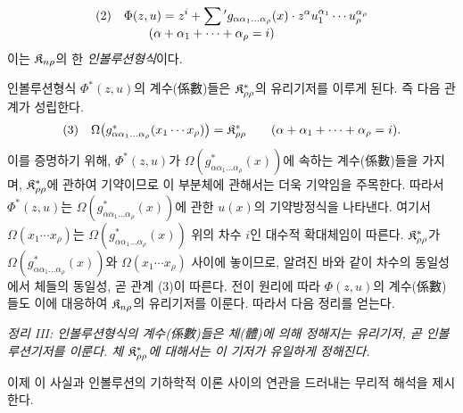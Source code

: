 \[
\begin{array}{@{}l@{\quad}l@{}}
(2)& \displaystyle \Phi(z,u)=z^i+\sum{}'g_{\alpha\alpha_1\ldots\alpha_\rho}(x)\cdot
z^\alpha u_1^{\alpha_1}\cdots u_\rho^{\alpha_\rho}\\
& \displaystyle\qquad(\alpha+\alpha_1+\cdots+\alpha_\rho=i)
\end{array}
\]
이는 $\mathfrak K_{n\rho}$의 한 \emph{인볼루션형식}이다.

인볼루션형식 $\Phi^*(z,u)$의 계수(係數)들은 $\mathfrak K^*_{\rho\rho}$의 유리기저를 이루게 된다. 즉 다음 관계가 성립한다.
\[
\begin{array}{@{}l@{\quad}c@{}}
(3)& \Omega\bigl(g^*_{\alpha\alpha_1\ldots\alpha_\rho}(x_1\cdots x_\rho)\bigr)=\Kfield^*_{\rho\rho}\qquad(\alpha+\alpha_1+\cdots+\alpha_\rho=i).
\end{array}
\]
이를 증명하기 위해, $\Phi^*(z,u)$가 $\Omega(g^*_{\alpha\alpha_1\ldots\alpha_\rho}(x))$에 속하는 계수(係數)들을 가지며, $\mathfrak K^*_{\rho\rho}$에 관하여 기약이므로 이 부분체에 관해서는 더욱 기약임을 주목한다. 따라서 $\Phi^*(z,u)$는 $\Omega(g^*_{\alpha\alpha_1\ldots\alpha_\rho}(x))$에 관한 $u(x)$의 기약방정식을 나타낸다. 여기서 $\Omega(x_1\cdots x_\rho)$는 $\Omega(g^*_{\alpha\alpha_1\ldots\alpha_\rho}(x))$ 위의 차수 $i$인 대수적 확대체임이 따른다. $\mathfrak K^*_{\rho\rho}$가 $\Omega(g^*_{\alpha\alpha_1\ldots\alpha_\rho}(x))$와 $\Omega(x_1\cdots x_\rho)$ 사이에 놓이므로, 알려진 바와 같이 차수의 동일성에서 체들의 동일성, 곧 관계 (3)이 따른다. 전이 원리에 따라 $\Phi(z,u)$의 계수(係數)들도 이에 대응하여 $\mathfrak K_{n\rho}$의 유리기저를 이룬다. 따라서 다음 정리를 얻는다.

\emph{정리 III: 인볼루션형식의 계수(係數)들은 체(體)에 의해 정해지는 유리기저, 곧 인볼루션기저를 이룬다. 체 $\mathfrak K^*_{\rho\rho}$에 대해서는 이 기저가 유일하게 정해진다.}

이제 이 사실과 인볼루션의 기하학적 이론 사이의 연관을 드러내는 무리적 해석을 제시한다.


